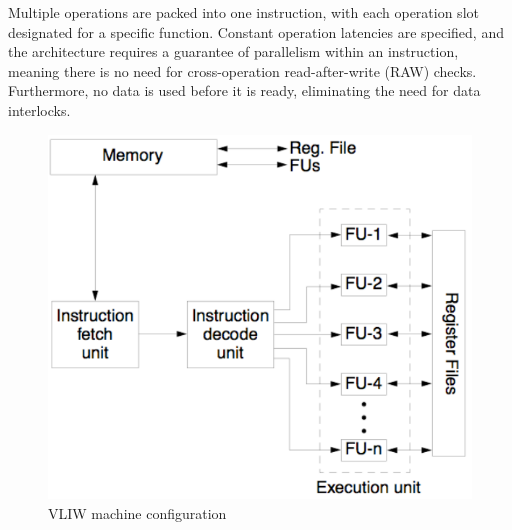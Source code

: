 Multiple operations are packed into one instruction, with each operation slot designated for a specific function. 
Constant operation latencies are specified, and the architecture requires a guarantee of parallelism within an instruction, meaning there is no need for cross-operation read-after-write (RAW) checks. 
Furthermore, no data is used before it is ready, eliminating the need for data interlocks.
\begin{figure}[H]
    \centering
    \includegraphics[width=0.75\linewidth]{images/vliw.png}
    \caption{VLIW machine configuration}
\end{figure}
